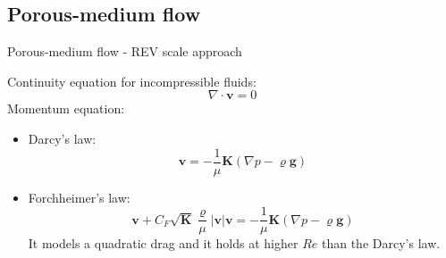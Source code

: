 \documentclass{beamer}
\begin{document}
\subsection*{Porous-medium flow}
\begin{frame}{Porous-medium flow - REV scale approach}
Continuity equation for incompressible fluids:
\begin{equation*}
\nabla \cdot \mathbf{v} = 0
\end{equation*}
Momentum equation:
\begin{itemize}
	\item Darcy's law:
\begin{equation*}
	\mathbf{v} = -\frac{1}{\mu}\mathbf{K} (\nabla p - \varrho \mathbf{g})
\end{equation*}
	\item Forchheimer's law:
	\begin{equation*}
	\mathbf{v} + C_F \sqrt{\mathbf{K}} \frac{\varrho}{\mu} |\mathbf{v}| 
	\mathbf{v} = - \frac{1}{\mu}\mathbf{K} (\nabla p - \varrho \mathbf{g})
	\end{equation*}
	It models a quadratic drag and it holds at higher $Re$ than the Darcy's law.
\end{itemize}
\end{frame}
\end{document}
